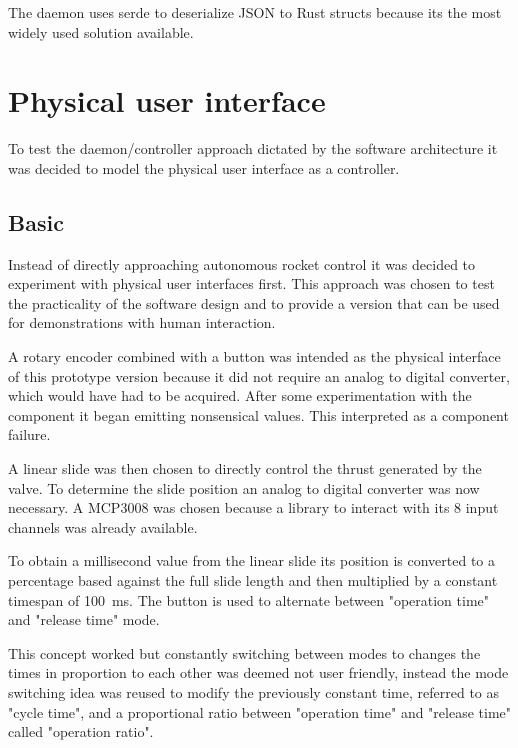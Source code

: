 The daemon uses serde \cite{serde} to deserialize JSON to Rust structs because its the most widely used solution available.

\section{Physical user interface}
\author{Sebastian Schaffler}

To test the daemon/controller approach dictated by the software architecture it was decided to model the physical user interface as a controller.

\subsection{Basic}
Instead of directly approaching autonomous rocket control it was decided to experiment with physical user interfaces first. This approach was chosen to test the practicality of the software design and to provide a version that can be used for demonstrations with human interaction. 

A rotary encoder \cite{rotary-encoder} combined with a button was intended as the physical interface of this prototype version because it did not require an analog to digital converter, which would have had to be acquired. After some experimentation with the component it began emitting nonsensical values. This interpreted as a component failure. 

A linear slide was then chosen to directly control the thrust generated by the valve. To determine the slide position an analog to digital converter was now necessary. A MCP3008 \cite{mcp3008} was chosen because a library \cite{mcp3008-library} to interact with its 8 input channels was already available. 

To obtain a millisecond value from the linear slide its position is converted to a percentage based against the full slide length and then multiplied by a constant timespan of \SI{100}{\milli\second}. The button is used to alternate between "operation time" and "release time" mode. 

This concept worked but constantly switching between modes to changes the times in proportion to each other was deemed not user friendly, instead the mode switching idea was reused to modify the previously constant time, referred to as "cycle time", and a proportional ratio between "operation time" and "release time" called "operation ratio".

